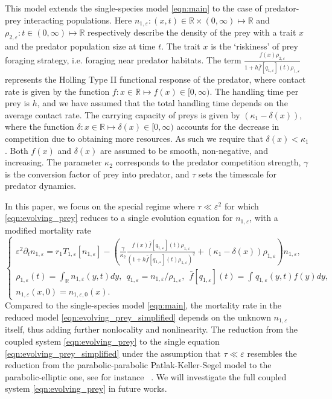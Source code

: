 \documentclass[]{article}
\theoremstyle{remark}
\begin{document}
This model extends the single-species model \eqref{eqn:main} to the case of predator-prey interacting populations. Here $n_{1,\varepsilon}:(x,t)\in\mathbb{R}\times (0,\infty)\mapsto \mathbb{R}$ and $\rho_{2,\varepsilon}: t\in (0,\infty)\mapsto \mathbb{R}$ respectively describe the density of the prey with a trait $x$ and the predator population size at time $t$. The trait $x$ is the `riskiness' of prey foraging strategy, i.e. foraging near predator habitats.
The term $\frac{f(x)\rho_{2,\varepsilon}}{1+h\bar{f}[q_{1,\varepsilon}](t)\rho_{1,\varepsilon}}$  represents the Holling Type II functional response of the predator, where contact rate is given by the function $f:x\in\mathbb{R}\mapsto{}f(x)\in [0,\infty)$. The handling time per prey is $h$, and we have assumed that the total handling time depends on the average contact rate.  The carrying capacity of preys is given by $(\kappa_1-\delta(x))$, where the function $\delta:x\in\mathbb{R}\mapsto \delta(x)\in\mathbb[0,\infty)$ accounts for the decrease in competition due to obtaining more resources. As such we require that $\delta(x)<\kappa_1$. Both $f(x)$ and $\delta(x)$ are assumed to be smooth, non-negative, and increasing. The parameter $\kappa_{2}$  corresponds to the predator competition strength,  $\gamma$ is the conversion factor of prey into predator, and $\tau$ sets the timescale for predator dynamics.



In this paper, we focus on the special regime where $\tau\ll\varepsilon^2$ for which \eqref{eqn:evolving_prey} reduces to a single evolution equation for $n_{1,\varepsilon}$, with a modified mortality rate
\begin{equation} \label{eqn:evolving_prey_simplified}
\begin{cases}
\varepsilon^2 \partial_t   n_{1,\varepsilon}= r_1T_{{1,\varepsilon}}  [ n_{1,\varepsilon}]  
-   \left( \frac{\gamma}{\kappa_2}\frac{f(x)\bar{f}[q_{1,\varepsilon}](t)\rho_{1,\varepsilon}}{(1+h\bar{f}[q_{1,\varepsilon}](t)\rho_{1,\varepsilon})^2}+(\kappa_1-\delta(x))\rho_{1,\varepsilon} \right) n_{1,\varepsilon} ,\\
\rho_{1,\varepsilon}(t)= \int_{\mathbb R}   n_{1,\varepsilon}(y,t)dy,~~q_{1,\varepsilon}=n_{1,\varepsilon}/\rho_{1,\varepsilon},~~\bar{f}[q_{1,\varepsilon}](t)=\int_{}q_{1,\varepsilon}(y,t)f(y)dy,\\
n_{1,\varepsilon}(x,0)=n_{{1,\varepsilon},0}(x). 
\end{cases}
\end{equation}
Compared to the single-species model \eqref{eqn:main}, the mortality rate in the reduced model \eqref{eqn:evolving_prey_simplified} depends on the unknown $n_{1,\varepsilon}$ itself, thus adding further nonlocality and nonlinearity. The reduction from the coupled system \eqref{eqn:evolving_prey} to the single equation \eqref{eqn:evolving_prey_simplified} under the 
assumption that $\tau\ll \varepsilon$  resembles the reduction from the parabolic-parabolic Patlak-Keller-Segel model to the parabolic-elliptic one, see for instance~ \cite{keller1970,hadeler2004langevin,blanchet2011}. We will investigate the full coupled system  \eqref{eqn:evolving_prey} in future works.
\end{document}
